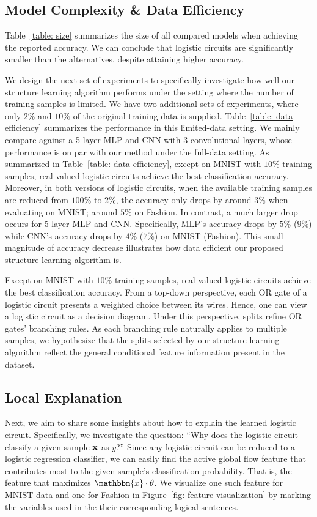 \documentclass[letterpaper]{article} %
\newcommand{\sample}{{\bf x}}
\begin{document}
\subsection{Model Complexity \& Data Efficiency}
Table~\ref{table: size} summarizes the size of all compared models when achieving the reported  accuracy. We can conclude that logistic circuits are significantly smaller than the alternatives, despite attaining higher accuracy. 

We design the next set of experiments to specifically investigate how well our structure learning algorithm performs under the setting where the number of training samples is limited.  We have two additional sets of experiments, where only $2\%$ and $10\%$ of the original training data is supplied. 
Table~\ref{table: data efficiency} summarizes the performance in this limited-data setting. 
We mainly compare against a 5-layer MLP and CNN with 3 convolutional layers, whose performance is on par with our method under the full-data setting. As summarized in Table~\ref{table: data efficiency}, except on MNIST with $10\%$ training samples, real-valued logistic circuits achieve the best classification accuracy. Moreover, in both versions of logistic circuits, when the available training samples are reduced from $100\%$ to $2\%$, the accuracy only drops by around $3\%$ when evaluating on MNIST; around $5\%$ on Fashion. In contrast, a much larger drop occurs for 5-layer MLP and CNN. Specifically, MLP's accuracy drops by $5\%$ ($9\%$) while CNN's accuracy drops by $4\%$ ($7\%$) on MNIST (Fashion). This small magnitude of accuracy decrease illustrates how data efficient our proposed structure learning algorithm is.

Except on MNIST with $10\%$ training samples, real-valued logistic circuits achieve the best classification accuracy. From a top-down perspective, each OR gate of a logistic circuit presents a weighted choice between its wires. Hence, one can view a logistic circuit as a decision diagram.
Under this perspective, splits refine OR gates' branching rules. As each branching rule naturally applies to multiple samples, we hypothesize that the splits selected by our structure learning algorithm reflect the general conditional feature information present in the dataset.



\subsection{Local Explanation}
\label{s: interpretability}
Next, we aim to share some insights about how to explain the learned logistic circuit. Specifically, we investigate the question: ``Why does the logistic circuit classify a given sample $\sample$ as $y$?'' Since any logistic circuit can be reduced to a logistic regression classifier, we can easily find the active global flow feature that contributes most to the given sample's classification probability. That is, the feature that maximizes $\mathbbm{x}\cdot\theta$. We visualize one such feature for MNIST data and one for Fashion in Figure~\ref{fig: feature visualization} by marking the variables used in the their corresponding logical sentences.
\end{document}
